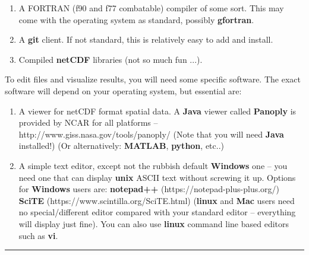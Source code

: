 \begin{enumerate}[noitemsep]
\vspace{1mm}
\begin{enumerate}[noitemsep]
\setlength{\itemindent}{.2in}
\item A FORTRAN (f90 and f77 combatable) compiler of some sort. This may come with the operating system as standard, possibly \textbf{gfortran}.
\item A \textbf{git} client. If not standard, this is relatively easy to add and install.
\item Compiled \textbf{netCDF} libraries (not so much fun ...).
\end{enumerate}
\vspace{1mm}
To edit files and visualize results, you will need some specific software. The exact software will depend on your operating system, but essential are:
\vspace{1mm}
\begin{enumerate}[noitemsep]
\setlength{\itemindent}{.2in}
\item A viewer for netCDF format spatial data. A \textbf{Java} viewer called \textbf{Panoply} is provided by NCAR for all platforms – http://www.giss.nasa.gov/tools/panoply/
(Note that you will need \textbf{Java} installed!) (Or alternatively: \textbf{MATLAB}, \textbf{python}, etc..)
\item  A simple text editor, except not the rubbish default \textbf{Windows} one – you need one that can display \textbf{unix} ASCII text without screwing it up. Options for \textbf{Windows} users are:
\textbf{notepad++} (https://notepad-plus-plus.org/)
\textbf{SciTE} (https://www.scintilla.org/SciTE.html)
(\textbf{linux} and \textbf{Mac} users need no special/different editor compared with your standard editor – everything will display just fine). You can also use \textbf{linux} command line based editors such as \textbf{vi}.
\end{enumerate}
\vspace{1mm}

\end{enumerate}
\vspace{1mm}

\vspace{1mm}\noindent\rule{4cm}{0.5pt}\vspace{2mm}

\newpage

